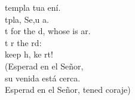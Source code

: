 \begin{cancion}%
	templa tua ení. \\
	tpla, Se,u a. \\
	t for the d, whose is ar. \\
	t r the rd: \\
	keep h, ke rt!\\
(Esperad en el Señor, \\
 su venida está cerca. \\
 Esperad en el Señor, tened coraje)\\
\end{cancion}%
